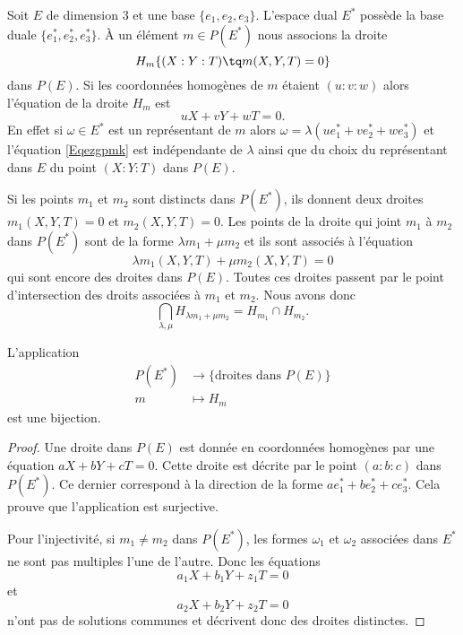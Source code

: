 Soit \( E\) de dimension \( 3\) et une base \( \{ e_1,e_2,e_3 \}\). L'espace dual \( E^*\) possède la base duale \( \{ e_1^*,e_2^*,e_3^* \}\). À un élément \( m\in P(E^*)\) nous associons la droite
\begin{equation}
    H_m\{ (X:Y:T)\tq m(X,Y,T)=0 \}
\end{equation}
dans \( P(E)\). Si les coordonnées homogènes de \( m\) étaient \( (u:v:w)\) alors l'équation de la droite \( H_m\) est 
\begin{equation}    \label{Eqezgpmk}
    uX+vY+wT=0.
\end{equation}
En effet si \( \omega\in E^*\) est un représentant de \( m\) alors \( \omega=\lambda(ue_1^*+ve_2^*+we_3^*)\) et l'équation \eqref{Eqezgpmk} est indépendante de \( \lambda\) ainsi que du choix du représentant dans \( E\) du point \( (X:Y:T)\) dans \( P(E)\).

Si les points \( m_1\) et \( m_2\) sont distincts dans \( P(E^*)\), ils donnent deux droites \( m_1(X,Y,T)=0\) et \( m_2(X,Y,T)=0\). Les points de la droite qui joint \( m_1\) à \( m_2\) dans \( P(E^*)\) sont de la forme \( \lambda m_1+\mu m_2\) et ils sont associés à l'équation
\begin{equation}
    \lambda m_1(X,Y,T)+\mu m_2(X,Y,T)=0
\end{equation}
qui sont encore des droites dans \( P(E)\). Toutes ces droites passent par le point d'intersection des droits associées à \( m_1\) et \( m_2\). Nous avons donc
\begin{equation}
    \bigcap_{\lambda,\mu}H_{\lambda m_1+\mu m_2}=H_{m_1}\cap H_{m_2}.
\end{equation}

\begin{lemma}
    L'application
    \begin{equation}
        \begin{aligned}
            P(E^*)&\to \{ \text{droites dans } P(E) \} \\
            m&\mapsto H_m 
        \end{aligned}
    \end{equation}
    est une bijection.
\end{lemma}

\begin{proof}
    Une droite dans \( P(E)\) est donnée en coordonnées homogènes par une équation \( aX+bY+cT=0\). Cette droite est décrite par le point \( (a:b:c)\) dans \( P(E^*)\). Ce dernier correspond à la direction de la forme \( ae_1^*+be_2^*+ce_3^*\). Cela prouve que l'application est surjective.

    Pour l'injectivité, si \( m_1\neq m_2\) dans \( P(E^*)\), les formes \( \omega_1\) et \( \omega_2\) associées dans \( E^*\) ne sont pas multiples l'une de l'autre. Donc les équations
    \begin{equation}
        a_1X+b_1Y+z_1T=0
    \end{equation}
    et
    \begin{equation}
        a_2X+b_2Y+z_2T=0
    \end{equation}
    n'ont pas de solutions communes et décrivent donc des droites distinctes.
\end{proof}

